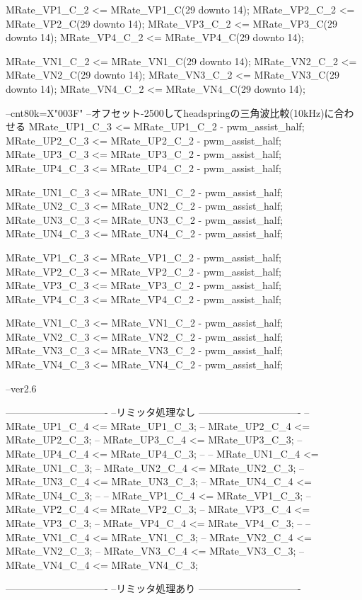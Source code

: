 \begin{mylisting}[language=VHDL,caption=ゲート信号出力モジュール,label=MMC_PWM_GEN_module_VHDL]
			MRate_VP1_C_2 <= MRate_VP1_C(29 downto 14);
			MRate_VP2_C_2 <= MRate_VP2_C(29 downto 14);
			MRate_VP3_C_2 <= MRate_VP3_C(29 downto 14);
			MRate_VP4_C_2 <= MRate_VP4_C(29 downto 14);
			
			MRate_VN1_C_2 <= MRate_VN1_C(29 downto 14);
			MRate_VN2_C_2 <= MRate_VN2_C(29 downto 14);
			MRate_VN3_C_2 <= MRate_VN3_C(29 downto 14);
			MRate_VN4_C_2 <= MRate_VN4_C(29 downto 14);

		--cnt80k=X"003F"
		--オフセット-2500してheadspringの三角波比較(10kHz)に合わせる
			MRate_UP1_C_3 <= MRate_UP1_C_2 - pwm_assist_half;
			MRate_UP2_C_3 <= MRate_UP2_C_2 - pwm_assist_half;
			MRate_UP3_C_3 <= MRate_UP3_C_2 - pwm_assist_half;
			MRate_UP4_C_3 <= MRate_UP4_C_2 - pwm_assist_half;

			MRate_UN1_C_3 <= MRate_UN1_C_2 - pwm_assist_half;
			MRate_UN2_C_3 <= MRate_UN2_C_2 - pwm_assist_half;
			MRate_UN3_C_3 <= MRate_UN3_C_2 - pwm_assist_half;
			MRate_UN4_C_3 <= MRate_UN4_C_2 - pwm_assist_half;
			
			MRate_VP1_C_3 <= MRate_VP1_C_2 - pwm_assist_half;
			MRate_VP2_C_3 <= MRate_VP2_C_2 - pwm_assist_half;
			MRate_VP3_C_3 <= MRate_VP3_C_2 - pwm_assist_half;
			MRate_VP4_C_3 <= MRate_VP4_C_2 - pwm_assist_half;

			MRate_VN1_C_3 <= MRate_VN1_C_2 - pwm_assist_half;
			MRate_VN2_C_3 <= MRate_VN2_C_2 - pwm_assist_half;
			MRate_VN3_C_3 <= MRate_VN3_C_2 - pwm_assist_half;
			MRate_VN4_C_3 <= MRate_VN4_C_2 - pwm_assist_half;

		--ver2.6

		-------------------------------
		--リミッタ処理なし
		-------------------------------
		--	MRate_UP1_C_4 <= MRate_UP1_C_3;
		--	MRate_UP2_C_4 <= MRate_UP2_C_3;
		--	MRate_UP3_C_4 <= MRate_UP3_C_3;
		--	MRate_UP4_C_4 <= MRate_UP4_C_3;
		--	
		--	MRate_UN1_C_4 <= MRate_UN1_C_3;
		--	MRate_UN2_C_4 <= MRate_UN2_C_3;
		--	MRate_UN3_C_4 <= MRate_UN3_C_3;
		--	MRate_UN4_C_4 <= MRate_UN4_C_3;
		--
		--	MRate_VP1_C_4 <= MRate_VP1_C_3;
		--	MRate_VP2_C_4 <= MRate_VP2_C_3;
		--	MRate_VP3_C_4 <= MRate_VP3_C_3;
		--	MRate_VP4_C_4 <= MRate_VP4_C_3;
		--	
		--	MRate_VN1_C_4 <= MRate_VN1_C_3;
		--	MRate_VN2_C_4 <= MRate_VN2_C_3;
		--	MRate_VN3_C_4 <= MRate_VN3_C_3;
		--	MRate_VN4_C_4 <= MRate_VN4_C_3;

		-------------------------------
		--リミッタ処理あり
		-------------------------------


\end{mylisting}
